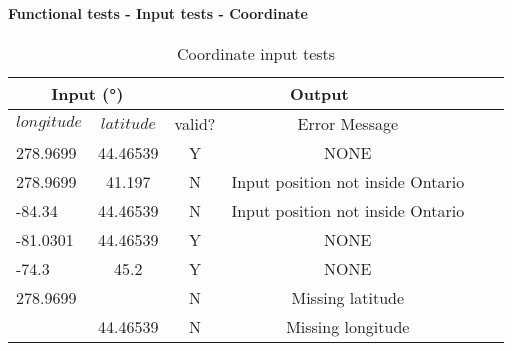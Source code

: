 \documentclass[12pt, titlepage]{article}
\begin{document}
		
\paragraph{Functional tests - Input tests - Coordinate}

\begin{center}
\begin{table}[h]
\resizebox{\textwidth}{!}
{ %
    \begin{tabular}{ lccccc }
    \hline
      \multicolumn{2}{c|}{Input (\si[per-mode=symbol] {\degree}) }                            & \multicolumn{2}{c}{Output} \\ 
    
    \hline
        $longitude$   &   $latitude$     &   valid?   &   Error Message \\ \hline
    
       278.9699  & 44.46539 &  Y  & NONE                         \\  \hline
       278.9699  & 41.197 &  N  & Input position not inside Ontario                         \\  \hline
       -84.34  & 44.46539 &  N  & Input position not inside Ontario                         \\  \hline
       -81.0301  & 44.46539 &  Y  & NONE                          \\  \hline
       -74.3  & 45.2 &  Y  &  NONE                        \\   \hline
       278.9699  &  &  N  & Missing latitude                         \\   \hline
      &  44.46539 &  N  & Missing longitude                       \\

    
    \hline
    
    
    \end{tabular} %
}
\caption{Coordinate input tests}
\label{Table:coordinate_test}
\end{table}
\end{center}
\end{document}
